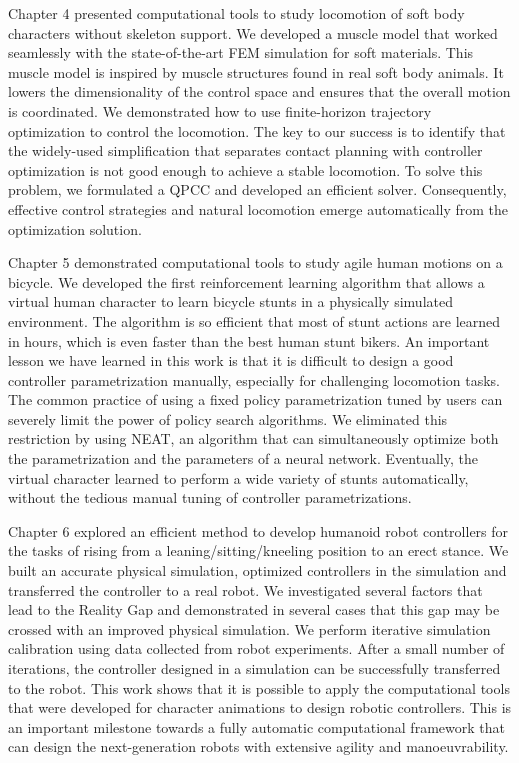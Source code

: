 Chapter 4 presented computational tools to study locomotion of soft body characters without skeleton support. We developed a muscle model that worked seamlessly with the state-of-the-art FEM simulation for soft materials. This muscle model is inspired by muscle structures found in real soft body animals. It lowers the dimensionality of the control space and ensures that the overall motion is coordinated. We demonstrated how to use finite-horizon trajectory optimization to control the locomotion. The key to our success is to identify that the widely-used simplification that separates contact planning with controller optimization is not good enough to achieve a stable locomotion. To solve this problem, we formulated a QPCC and developed an efficient solver. Consequently, effective control strategies and natural locomotion emerge automatically from the optimization solution.

Chapter 5 demonstrated computational tools to study agile human motions on a bicycle. We developed the first reinforcement learning algorithm that allows a virtual human character to learn bicycle stunts in a physically simulated environment. The algorithm is so efficient that most of stunt actions are learned in hours, which is even faster than the best human stunt bikers. An important lesson we have learned in this work is that it is difficult to design a good controller parametrization manually, especially for challenging locomotion tasks. The common practice of using a fixed policy parametrization tuned by users can severely limit the power of policy search algorithms. We eliminated this restriction by using NEAT, an algorithm that can simultaneously optimize both the parametrization and the parameters of a neural network. Eventually, the virtual character learned to perform a wide variety of stunts automatically, without the tedious manual tuning of controller parametrizations.

Chapter 6 explored an efficient method to develop humanoid robot controllers for the tasks of rising from a leaning/sitting/kneeling position to an erect stance. We built an accurate physical simulation, optimized controllers in the simulation and transferred the controller to a real robot. We investigated several factors that lead to the Reality Gap and demonstrated in several cases that this gap may be crossed with an improved physical simulation. We perform iterative simulation calibration using data collected from robot experiments. After a small number of iterations, the controller designed in a simulation can be successfully transferred to the robot. This work shows that it is possible to apply the computational tools that were developed for character animations to design robotic controllers. This is an important milestone towards a fully automatic computational framework that can design the next-generation robots with extensive agility and manoeuvrability.

